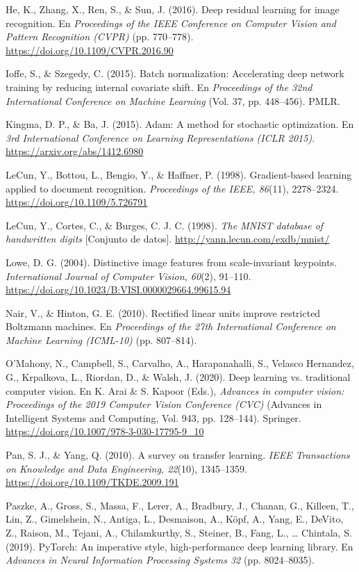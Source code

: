 \documentclass[11pt,letterpaper]{article}
\begin{document}
He, K., Zhang, X., Ren, S., \& Sun, J. (2016). Deep residual learning for image recognition. En \emph{Proceedings of the IEEE Conference on Computer Vision and Pattern Recognition (CVPR)} (pp. 770--778). \url{https://doi.org/10.1109/CVPR.2016.90}

Ioffe, S., \& Szegedy, C. (2015). Batch normalization: Accelerating deep network training by reducing internal covariate shift. En \emph{Proceedings of the 32nd International Conference on Machine Learning} (Vol. 37, pp. 448--456). PMLR.

Kingma, D. P., \& Ba, J. (2015). Adam: A method for stochastic optimization. En \emph{3rd International Conference on Learning Representations (ICLR 2015)}. \url{https://arxiv.org/abs/1412.6980}

LeCun, Y., Bottou, L., Bengio, Y., \& Haffner, P. (1998). Gradient-based learning applied to document recognition. \emph{Proceedings of the IEEE, 86}(11), 2278--2324. \url{https://doi.org/10.1109/5.726791}

LeCun, Y., Cortes, C., \& Burges, C. J. C. (1998). \emph{The MNIST database of handwritten digits} [Conjunto de datos]. \url{http://yann.lecun.com/exdb/mnist/}

Lowe, D. G. (2004). Distinctive image features from scale-invariant keypoints. \emph{International Journal of Computer Vision, 60}(2), 91--110. \url{https://doi.org/10.1023/B:VISI.0000029664.99615.94}

Nair, V., \& Hinton, G. E. (2010). Rectified linear units improve restricted Boltzmann machines. En \emph{Proceedings of the 27th International Conference on Machine Learning (ICML-10)} (pp. 807--814).

O'Mahony, N., Campbell, S., Carvalho, A., Harapanahalli, S., Velasco Hernandez, G., Krpalkova, L., Riordan, D., \& Walsh, J. (2020). Deep learning vs. traditional computer vision. En K. Arai \& S. Kapoor (Eds.), \emph{Advances in computer vision: Proceedings of the 2019 Computer Vision Conference (CVC)} (Advances in Intelligent Systems and Computing, Vol. 943, pp. 128--144). Springer. \url{https://doi.org/10.1007/978-3-030-17795-9_10}

Pan, S. J., \& Yang, Q. (2010). A survey on transfer learning. \emph{IEEE Transactions on Knowledge and Data Engineering, 22}(10), 1345--1359. \url{https://doi.org/10.1109/TKDE.2009.191}

Paszke, A., Gross, S., Massa, F., Lerer, A., Bradbury, J., Chanan, G., Killeen, T., Lin, Z., Gimelshein, N., Antiga, L., Desmaison, A., Köpf, A., Yang, E., DeVito, Z., Raison, M., Tejani, A., Chilamkurthy, S., Steiner, B., Fang, L., \ldots{} Chintala, S. (2019). PyTorch: An imperative style, high-performance deep learning library. En \emph{Advances in Neural Information Processing Systems 32} (pp. 8024--8035).
\end{document}
